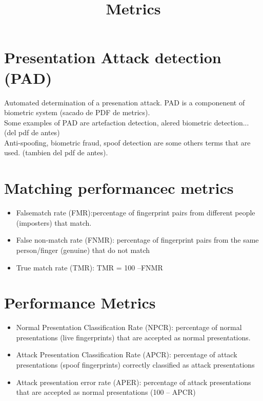 \documentclass[a4paper]{article}
\begin{document}
\title{Metrics}
\maketitle

\section{Presentation Attack detection (PAD)}

Automated determination of a presenation attack. PAD is a componenent of biometric system (sacado de PDF de metrics).\\

Some examples of PAD are artefaction detection, alered biometric detection... (del pdf de antes)\\

Anti-spoofing, biometric fraud, spoof detection are some others terms that are used. (tambien del pdf de antes).\\



\section{Matching performancec metrics}

\begin{itemize}
\item Falsematch rate (FMR):percentage of fingerprint pairs from different people (imposters) that match.
\item False non-match rate (FNMR): percentage of fingerprint pairs from the same person/finger (genuine) that do not match 
\item True match rate (TMR): TMR = 100 –FNMR

\end{itemize}

\section{Performance Metrics}
\begin{itemize}
\item Normal Presentation Classification Rate (NPCR): percentage of normal presentations (live fingerprints) that are accepted as normal presentations.
\item Attack Presentation Classification Rate (APCR): percentage of attack presentations (spoof fingerprints) correctly classified as attack presentations
\item Attack presentation error rate (APER): percentage of attack presentations that are accepted as normal presentations (100 – APCR)
\end{itemize}
\end{document}
